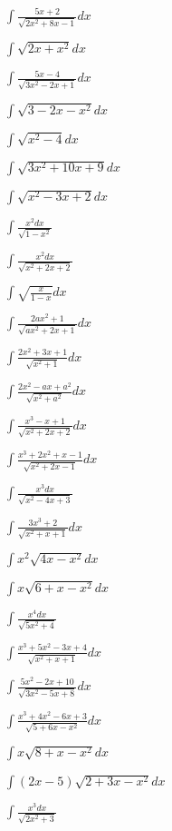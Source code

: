 \begin{multicols}{2}
$\displaystyle \int \frac{5x+2}{\sqrt{2x^2+8x-1}}dx$

$\displaystyle \int \sqrt{2x+x^2}dx$

$\displaystyle \int \frac{5x-4}{\sqrt{3x^2-2x+1}}dx$

$\displaystyle \int \sqrt{3-2x-x^2}dx$

$\displaystyle \int \sqrt{x^2-4}dx$

$\displaystyle \int \sqrt{3x^2+10x+9}dx$

$\displaystyle \int \sqrt{x^2-3x+2}dx$

$\displaystyle \int \frac{x^2dx}{\sqrt{1-x^2}}$

$\displaystyle \int \frac{x^2dx}{\sqrt{x^2+2x+2}}$

$\displaystyle \int \sqrt{\frac{x}{1-x}}dx$

$\displaystyle \int \frac{2ax^2+1}{\sqrt{ax^2+2x+1}}dx$

$\displaystyle \int \frac{2x^2+3x+1}{\sqrt{x^2+1}}dx$

$\displaystyle \int \frac{2x^2-ax+a^2}{\sqrt{x^2+a^2}}dx$

$\displaystyle \int \frac{x^3-x+1}{\sqrt{x^2+2x+2}}dx$

$\displaystyle \int \frac{x^3+2x^2+x-1}{\sqrt{x^2+2x-1}}dx$

$\displaystyle \int \frac{x^3dx}{\sqrt{x^2-4x+3}}$

$\displaystyle \int \frac{3x^3+2}{\sqrt{x^2+x+1}}dx$

$\displaystyle \int x^2\sqrt{4x-x^2}dx$

$\displaystyle \int x\sqrt{6+x-x^2}dx$

$\displaystyle \int \frac{x^4dx}{\sqrt{5x^2+4}}$

$\displaystyle \int \frac{x^3+5x^2-3x+4}{\sqrt{x^2+x+1}}dx$

$\displaystyle \int \frac{5x^2-2x+10}{\sqrt{3x^2-5x+8}}dx$

$\displaystyle \int \frac{x^3+4x^2-6x+3}{\sqrt{5+6x-x^2}}dx$

$\displaystyle \int x\sqrt{8+x-x^2}dx$

$\displaystyle \int (2x-5)\sqrt{2+3x-x^2}dx$

$\displaystyle \int \frac{x^3dx}{\sqrt{2x^2+3}}$


\end{multicols}
